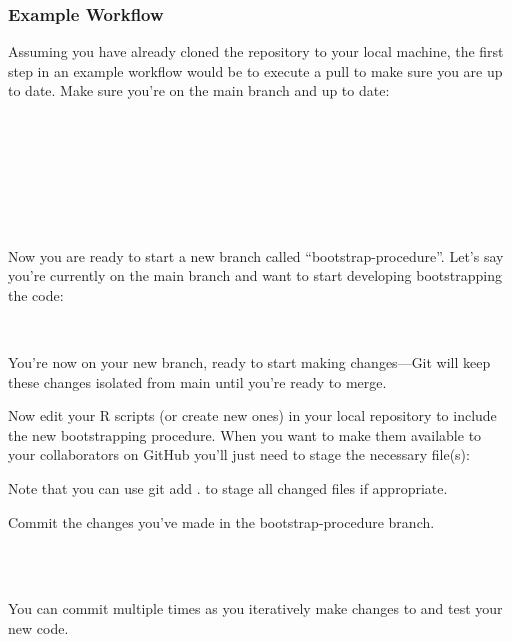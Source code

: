 \subsubsection{Example Workflow}
Assuming you have already cloned the repository to your local machine, the first step in an example workflow would be to execute a pull to make sure you are up to date. Make sure you're on the main branch and up to date:
\begin{terminal}
\\
\\
\\
\\
\\
\\
\end{terminal}
Now you are ready to start a new branch called ``bootstrap-procedure''. Let's say you're currently on the main branch and want to start developing bootstrapping the code:
\begin{terminal}
\\
\end{terminal}
You're now on your new branch, ready to start making changes—Git will keep these changes isolated from main until you're ready to merge.

Now edit your R scripts (or create new ones) in your local repository to include the new bootstrapping procedure.  When you want to make them available to your collaborators on GitHub you'll just need to stage the necessary file(s):
\begin{terminal}
\end{terminal}
Note that you can use git add . to stage all changed files if appropriate.

Commit the changes you've made in the bootstrap-procedure branch.
\begin{terminal}
\\
 \\
\end{terminal}
You can commit multiple times as you iteratively make changes to and test your new code.

